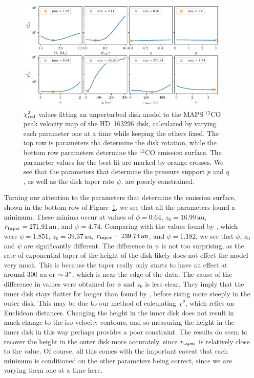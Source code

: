 \begin{figure}
    \centering
    \includegraphics[width = 0.95\textwidth]{figures/chi_sq_background_hd163.pdf}
    \caption{$\chi_{\rm red}^2$ values fitting an unperturbed disk model to the MAPS $^{12}$CO peak velocity map of the HD~163296 disk, calculated by varying each parameter one at a time while keeping the others fixed. The top row is parameters tha determine the disk rotation, while the bottom row parameters determine the $^{12}$CO emission surface. The parameter values for the best-fit are marked by orange crosses. We see that the parameters that determine the pressure support $p$ and $q$, as well as the disk taper rate $\psi$, are poorly constrained.}
    \label{fig:grid_chisq_background}
\end{figure}

Turning our attention to the parameters that determine the emission surface, shown in the bottom row of Figure~\ref{fig:grid_chisq_background}, we see that all the parameters found a minimum.
These minima occur at values of $\phi = 0.64$, $z_0 = 16.99 \, \mathrm{au}$, $r_{\rm taper} = 271.91 \, \mathrm{au}$, and $\psi = 4.74$.
Comparing with the values found by \citet{law2021a}, which were $\phi = 1.851$, $z_0 = 39.37 \, \mathrm{au}$, $r_{\rm taper} = 239.74 \, \mathrm{au}$, and $\psi = 1.182$, we see that $\phi$, $z_0$ and $\psi$ are significantly different.
The difference in $\psi$ is not too surprising, as the rate of exponential taper of the height of the disk likely does not effect the model very much.
This is because the taper really only starts to have an effect at around $300$ au or $\sim3"$, which is near the edge of the data.
The cause of the difference in values were obtained for $\phi$ and $z_0$ is less clear.
They imply that the inner disk stays flatter for longer than found by \citet{law2021a}, before rising more steeply in the outer disk.
This may be due to our method of calculating $\chi^2$, which relies on Euclidean distances.
Changing the height in the inner disk does not result in much change to the iso-velocity contours, and so measuring the height in the inner disk in this way perhaps provides a poor constraint.
The results do seem to recover the height in the outer disk more accurately, since $r_{\rm taper}$ is relatively close to the \citet{law2021a} value.
Of course, all this comes with the important caveat that each minimum is conditioned on the other parameters being correct, since we are varying them one at a time here.

